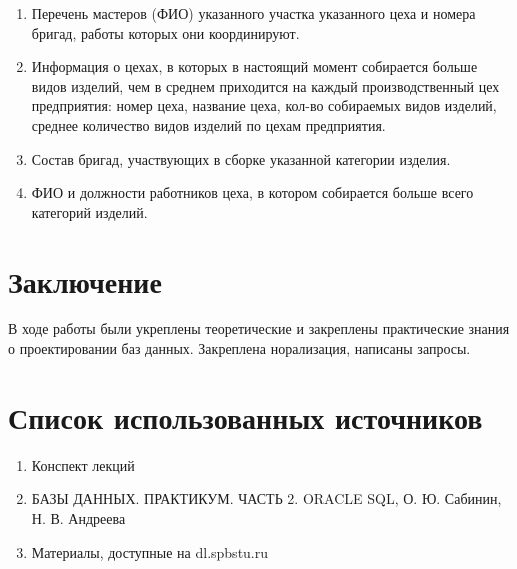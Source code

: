 \begin{enumerate}
    \item Перечень мастеров (ФИО) указанного участка указанного цеха и номера бригад, работы которых они координируют.

    

    \item Информация о цехах, в которых в настоящий момент собирается больше видов изделий, чем в среднем приходится на каждый производственный цех предприятия: номер цеха, название цеха, кол-во собираемых видов изделий, среднее количество видов изделий по цехам предприятия.

    

    \item Состав бригад, участвующих в сборке указанной категории изделия.

    

    \item ФИО и должности работников цеха, в котором собирается больше всего категорий изделий.

    

\end{enumerate}

\section{Заключение}
В ходе работы были укреплены теоретические и закреплены практические знания о проектировании баз данных.
Закреплена норализация, написаны запросы.

\section{Список использованных источников}

\begin{enumerate}

    \item Конспект лекций
    \item БАЗЫ ДАННЫХ. ПРАКТИКУМ. ЧАСТЬ 2. ORACLE SQL, О. Ю. Сабинин, Н. В. Андреева
    \item Материалы, доступные на dl.spbstu.ru

\end{enumerate}

